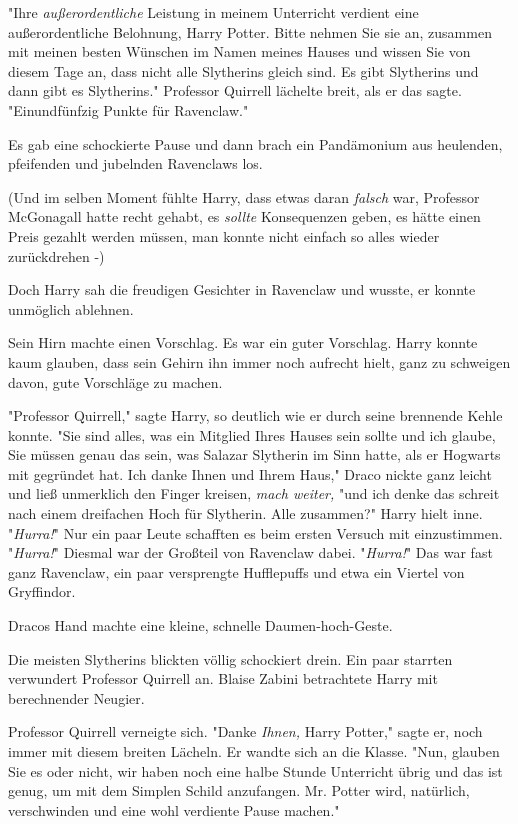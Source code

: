 {"Ihre \emph{außerordentliche} Leistung in meinem Unterricht verdient eine außerordentliche Belohnung, Harry Potter. Bitte nehmen Sie sie an, zusammen mit meinen besten Wünschen im Namen meines Hauses und wissen Sie von diesem Tage an, dass nicht alle Slytherins gleich sind. Es gibt Slytherins und dann gibt es Slytherins." Professor Quirrell lächelte breit, als er das sagte. "Einundfünfzig Punkte für Ravenclaw."

Es gab eine schockierte Pause und dann brach ein Pandämonium aus heulenden, pfeifenden und jubelnden Ravenclaws los.

(Und im selben Moment fühlte Harry, dass etwas daran \emph{falsch} war, Professor McGonagall hatte recht gehabt, es \emph{sollte} Konsequenzen geben, es hätte einen Preis gezahlt werden müssen, man konnte nicht einfach so alles wieder zurückdrehen -)

Doch Harry sah die freudigen Gesichter in Ravenclaw und wusste, er konnte unmöglich ablehnen.

Sein Hirn machte einen Vorschlag. Es war ein guter Vorschlag. Harry konnte kaum glauben, dass sein Gehirn ihn immer noch aufrecht hielt, ganz zu schweigen davon, gute Vorschläge zu machen.

"Professor Quirrell," sagte Harry, so deutlich wie er durch seine brennende Kehle konnte. "Sie sind alles, was ein Mitglied Ihres Hauses sein sollte und ich glaube, Sie müssen genau das sein, was Salazar Slytherin im Sinn hatte, als er Hogwarts mit gegründet hat. Ich danke Ihnen und Ihrem Haus," Draco nickte ganz leicht und ließ unmerklich den Finger kreisen, \emph{mach weiter,} "und ich denke das schreit nach einem dreifachen Hoch für Slytherin. Alle zusammen?" Harry hielt inne. "\emph{Hurra!}" Nur ein paar Leute schafften es beim ersten Versuch mit einzustimmen. "\emph{Hurra!}" Diesmal war der Großteil von Ravenclaw dabei. "\emph{Hurra!}" Das war fast ganz Ravenclaw, ein paar versprengte Hufflepuffs und etwa ein Viertel von Gryffindor.

Dracos Hand machte eine kleine, schnelle Daumen-hoch-Geste.

Die meisten Slytherins blickten völlig schockiert drein. Ein paar starrten verwundert Professor Quirrell an. Blaise Zabini betrachtete Harry mit berechnender Neugier.

Professor Quirrell verneigte sich. "Danke \emph{Ihnen,} Harry Potter," sagte er, noch immer mit diesem breiten Lächeln. Er wandte sich an die Klasse. "Nun, glauben Sie es oder nicht, wir haben noch eine halbe Stunde Unterricht übrig und das ist genug, um mit dem Simplen Schild anzufangen. Mr. Potter wird, natürlich, verschwinden und eine wohl verdiente Pause machen."

}
